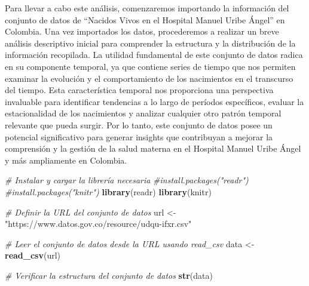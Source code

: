 \documentclass[
]{book}
\newenvironment{Shaded}{\begin{snugshade}}{\end{snugshade}}
\newcommand{\CommentTok}[1]{\textcolor[rgb]{0.56,0.35,0.01}{\textit{#1}}}
\newcommand{\FunctionTok}[1]{\textcolor[rgb]{0.13,0.29,0.53}{\textbf{#1}}}
\newcommand{\NormalTok}[1]{#1}
\newcommand{\OtherTok}[1]{\textcolor[rgb]{0.56,0.35,0.01}{#1}}
\newcommand{\StringTok}[1]{\textcolor[rgb]{0.31,0.60,0.02}{#1}}
\begin{document}
Para llevar a cabo este análisis, comenzaremos importando la información del conjunto de datos de ``Nacidos Vivos en el Hospital Manuel Uribe Ángel'' en Colombia. Una vez importados los datos, procederemos a realizar un breve análisis descriptivo inicial para comprender la estructura y la distribución de la información recopilada. La utilidad fundamental de este conjunto de datos radica en su componente temporal, ya que contiene series de tiempo que nos permiten examinar la evolución y el comportamiento de los nacimientos en el transcurso del tiempo. Esta característica temporal nos proporciona una perspectiva invaluable para identificar tendencias a lo largo de períodos específicos, evaluar la estacionalidad de los nacimientos y analizar cualquier otro patrón temporal relevante que pueda surgir. Por lo tanto, este conjunto de datos posee un potencial significativo para generar insights que contribuyan a mejorar la comprensión y la gestión de la salud materna en el Hospital Manuel Uribe Ángel y más ampliamente en Colombia.

\begin{Shaded}
\begin{Highlighting}[]
\CommentTok{\# Instalar y cargar la librería necesaria}
\CommentTok{\#install.packages("readr")}
\CommentTok{\#install.packages("knitr")}
\FunctionTok{library}\NormalTok{(readr)}
\FunctionTok{library}\NormalTok{(knitr)}

\CommentTok{\# Definir la URL del conjunto de datos}
\NormalTok{url }\OtherTok{\textless{}{-}} \StringTok{"https://www.datos.gov.co/resource/udqu{-}ifxr.csv"}

\CommentTok{\# Leer el conjunto de datos desde la URL usando read\_csv}
\NormalTok{data }\OtherTok{\textless{}{-}} \FunctionTok{read\_csv}\NormalTok{(url)}

\CommentTok{\# Verificar la estructura del conjunto de datos}
\FunctionTok{str}\NormalTok{(data)}
\end{Highlighting}
\end{Shaded}
\end{document}
